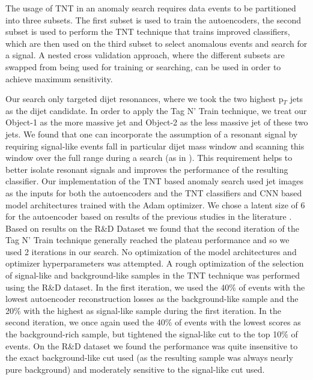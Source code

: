 \documentclass[a4paper,11pt]{article}
\begin{document}
The usage of TNT in an anomaly search requires data events to be partitioned into three subsets. 
The first subset is used to train the autoencoders, the second subset is used to perform the TNT technique that trains improved classifiers, which are then used on the third subset to select anomalous events and search for a signal. 
A nested cross validation approach, where the different subsets are swapped from being used for training or searching, can be used in order to achieve maximum sensitivity. 

Our search only targeted dijet resonances, where we took the two highest p$_T$ jets as the dijet candidate.
In order to apply the Tag N' Train technique, we treat our Object-1 as the more massive jet and Object-2 as the less massive jet of these two jets.
We found that one can incorporate the assumption of a resonant signal by requiring signal-like events fall in particular dijet mass window and scanning this window over the full range during a search (as in \cite{Collins:2018epr,Collins:2019jip}). 
This requirement helps to better isolate resonant signals and improves the performance of the resulting classifier. 
Our implementation of the TNT based anomaly search used jet images as the inputs for both the autoencoders and the TNT classifiers and CNN based model architectures trained with the Adam optimizer. 
We chose a latent size of 6 for the autoencoder based on results of the previous studies in the literature \cite{Farina:2018fyg,Heimel:2018mkt}.
Based on results on the R\&D Dataset we found that the second iteration of the Tag N' Train technique generally reached the plateau performance and so we used 2 iterations in our search.
No optimization of the model architectures and optimizer hyperparameters was attempted.
A rough optimization of the selection of signal-like and background-like samples in the TNT technique was performed using the R\&D dataset.
In the first iteration, we used the 40\% of events with the lowest autoencoder reconstruction losses as the background-like sample and the 20\% with the highest as signal-like sample during the first iteration.
In the second iteration, we once again used the 40\% of events with the lowest scores as the background-rich sample, but tightened the signal-like cut to the top 10\% of events. 
On the R\&D dataset we found the performance was quite insensitive to the exact background-like cut used (as the resulting sample was always nearly pure background) and moderately sensitive to the signal-like cut used. 
\end{document}
